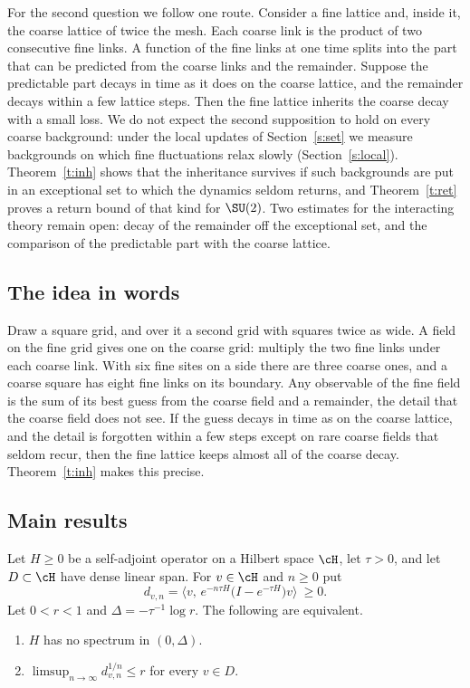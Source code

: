 For the second question we follow one route. Consider a fine lattice and, inside it, the coarse lattice of
twice the mesh. Each coarse link is the product of two consecutive fine links. A function of the fine links at
one time splits into the part that can be predicted from the coarse links and the remainder. Suppose the
predictable part decays in time as it does on the coarse lattice, and the remainder decays within a few
lattice steps. Then the fine lattice inherits the coarse decay with a small loss. We do not expect the second
supposition to hold on every coarse background: under the local updates of Section~\ref{s:set} we measure
backgrounds on which fine fluctuations relax slowly (Section~\ref{s:local}). Theorem~\ref{t:inh} shows that the
inheritance survives if such backgrounds are put in an exceptional set to which the dynamics seldom returns,
and Theorem~\ref{t:ret} proves a return bound of that kind for $\SU(2)$. Two estimates for the interacting
theory remain open: decay of the remainder off the exceptional set, and the comparison of the predictable
part with the coarse lattice.

\subsection{The idea in words}
Draw a square grid, and over it a second grid with squares twice as wide. A field on the fine grid gives one
on the coarse grid: multiply the two fine links under each coarse link. With six fine sites on a side there
are three coarse ones, and a coarse square has eight fine links on its boundary. Any observable of the fine
field is the sum of its best guess from the coarse field and a remainder, the detail that the coarse field
does not see. If the guess decays in time as on the coarse lattice, and the detail is forgotten within a few
steps except on rare coarse fields that seldom recur, then the fine lattice keeps almost all of the coarse
decay. Theorem~\ref{t:inh} makes this precise.

\subsection{Main results}
\begin{theorem}\label{t:crit}
Let $H\ge0$ be a self-adjoint operator on a Hilbert space $\cH$, let $\tau>0$, and let $D\subset\cH$ have dense
linear span. For $v\in\cH$ and $n\ge0$ put
\[
d_{v,n}=\big\langle v,\,e^{-n\tau H}\big(I-e^{-\tau H}\big)v\big\rangle\ \ge0 .
\]
Let $0<r<1$ and $\Delta=-\tau^{-1}\log r$. The following are equivalent.
\begin{enumerate}
\item $H$ has no spectrum in $(0,\Delta)$.
\item $\limsup_{n\to\infty}d_{v,n}^{1/n}\le r$ for every $v\in D$.
\end{enumerate}
\end{theorem}

